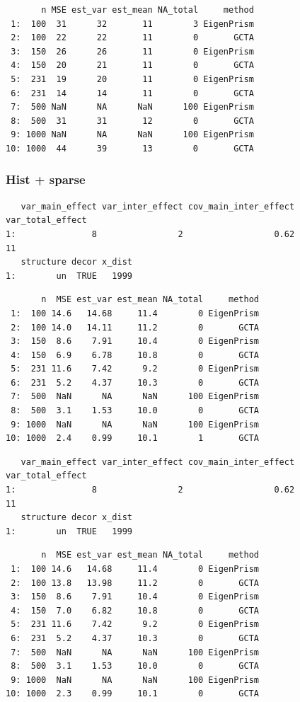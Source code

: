 \documentclass[]{article}
\begin{document}
\begin{verbatim}
       n MSE est_var est_mean NA_total     method
 1:  100  31      32       11        3 EigenPrism
 2:  100  22      22       11        0       GCTA
 3:  150  26      26       11        0 EigenPrism
 4:  150  20      21       11        0       GCTA
 5:  231  19      20       11        0 EigenPrism
 6:  231  14      14       11        0       GCTA
 7:  500 NaN      NA      NaN      100 EigenPrism
 8:  500  31      31       12        0       GCTA
 9: 1000 NaN      NA      NaN      100 EigenPrism
10: 1000  44      39       13        0       GCTA
\end{verbatim}

\subsubsection{Hist + sparse}\label{hist-sparse}

\begin{verbatim}
   var_main_effect var_inter_effect cov_main_inter_effect var_total_effect
1:               8                2                  0.62               11
   structure decor x_dist
1:        un  TRUE   1999
\end{verbatim}

\begin{verbatim}
       n  MSE est_var est_mean NA_total     method
 1:  100 14.6   14.68     11.4        0 EigenPrism
 2:  100 14.0   14.11     11.2        0       GCTA
 3:  150  8.6    7.91     10.4        0 EigenPrism
 4:  150  6.9    6.78     10.8        0       GCTA
 5:  231 11.6    7.42      9.2        0 EigenPrism
 6:  231  5.2    4.37     10.3        0       GCTA
 7:  500  NaN      NA      NaN      100 EigenPrism
 8:  500  3.1    1.53     10.0        0       GCTA
 9: 1000  NaN      NA      NaN      100 EigenPrism
10: 1000  2.4    0.99     10.1        1       GCTA
\end{verbatim}

\begin{verbatim}
   var_main_effect var_inter_effect cov_main_inter_effect var_total_effect
1:               8                2                  0.62               11
   structure decor x_dist
1:        un  TRUE   1999
\end{verbatim}

\begin{verbatim}
       n  MSE est_var est_mean NA_total     method
 1:  100 14.6   14.68     11.4        0 EigenPrism
 2:  100 13.8   13.98     11.2        0       GCTA
 3:  150  8.6    7.91     10.4        0 EigenPrism
 4:  150  7.0    6.82     10.8        0       GCTA
 5:  231 11.6    7.42      9.2        0 EigenPrism
 6:  231  5.2    4.37     10.3        0       GCTA
 7:  500  NaN      NA      NaN      100 EigenPrism
 8:  500  3.1    1.53     10.0        0       GCTA
 9: 1000  NaN      NA      NaN      100 EigenPrism
10: 1000  2.3    0.99     10.1        0       GCTA
\end{verbatim}
\end{document}
